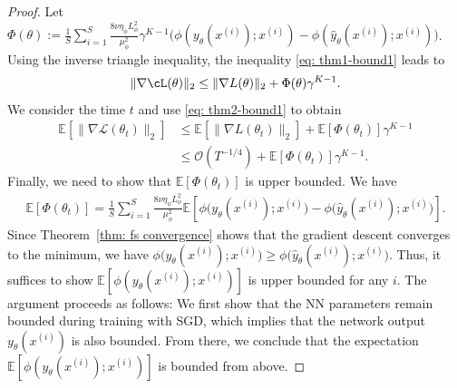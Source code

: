 \documentclass{article}
\def\E{\mathbb{E}}
\newcommand{\bigO}{\mathcal{O}}
\def\x{x}
\def\y{y_{\theta}}   \def\hy{\hat{y}_{\theta}}    \def\ty{\Tilde{y}}
\def\i{{(i)}}
\begin{document}
\begin{proof}
Let $ \Phi(\theta) := \frac{1}{S}\sum_{i=1}^S \frac{8 \nu\eta_\phi L_\phi^2}{\mu_\phi^2} \gamma^{K-1} \big(\phi(\y(\x^\i); \x^\i) - \phi(\hy(\x^\i); \x^\i) \big) $.
Using the inverse triangle inequality, the inequality \eqref{eq: thm1-bound1} leads to
\begin{align*}
    \|\nabla \cL(\theta) \|_2 \leq \|  \nabla L(\theta) \|_2 + \Phi(\theta) \gamma^{K-1}.
\end{align*}
We consider the time $t$ and use \eqref{eq: thm2-bound1} to obtain
\begin{align}
    \mathbb{E} [\|\nabla \mathcal{L}(\theta_t) \|_2] &\leq \mathbb{E} [ \|  \nabla L(\theta_t) \|_2] + \mathbb{E} [\Phi(\theta_t)] \gamma^{K-1} \nonumber \\
    &\leq \bigO(T^{-1/4}) +  \mathbb{E} [\Phi(\theta_t)] \gamma^{K-1}. \label{eq: grad bound}
\end{align}
Finally, we need to show that $\mathbb{E} [\Phi(\theta_t)]$ is upper bounded. 
We have 
\begin{align}\label{eq: Phi}
    \mathbb{E} [\Phi(\theta_t)] = \frac{1}{S}\sum_{i=1}^S \frac{8 \nu\eta_\phi L_\phi^2}{\mu_\phi^2} \mathbb{E} \left[\phi \big( \y(\x^\i); \x^\i \big) - \phi \big(\hy(\x^\i); \x^\i \big)\right].
\end{align}
Since Theorem~\ref{thm: fs convergence} shows that the gradient descent converges to the minimum, we have $\phi \big( \y(\x^\i); \x^\i \big) \geq \phi \big(\hy(\x^\i); \x^\i \big)$. Thus, it suffices to show $\E[\phi(\y(\x^\i); \x^\i)]$ is upper bounded for any $i$.
The argument proceeds as follows: We first show that the NN parameters remain bounded during training with SGD, which implies that the network output $\y(\x^\i)$ is also bounded. From there, we conclude that the expectation $\E[\phi(\y(\x^\i); \x^\i)]$ is bounded from above.



\end{proof}
\end{document}
